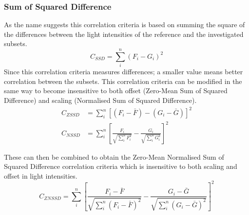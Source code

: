 \documentclass[12pt,oneside,openany,a4paper, %
english, %
masters-t, goldenblock]{usthesis}
\newcommand*\mean[1]{\bar{#1}} %
\begin{document}
\subsubsection{Sum of Squared Difference}
As the name suggests this correlation criteria is based on summing the square of the differences between the light intensities of the reference and the investigated subsets.
\begin{equation}
  C_{SSD} = \sum_i^n \left( F_i - G_i \right)^2 \label{eq: ssd}
\end{equation}
Since this correlation criteria measures differences; a smaller value means better correlation between the subsets. This correlation criteria can be modified in the same way to become insensitive to both offset (Zero-Mean Sum of Squared Difference) and scaling (Normalised Sum of Squared Difference).
\begin{align}
  C_{ZSSD} &= \sum_i^n \left[ \left( F_i - \mean{F} \right) - \left( G_i - \mean{G} \right) \right]^2 \label{eq: zssd} \\
  C_{NSSD} &= \sum_i^n \left[ \frac{F_i}{\sqrt{\sum_i^n F_i^2}} - \frac{G_i}{\sqrt{\sum_i^n G_i^2}} \right]^2 \label{eq: nssd}
\end{align}

These can then be combined to obtain the Zero-Mean Normalised Sum of Squared Difference correlation criteria which is insensitive to both scaling and offset in light intensities.
\begin{equation}
\label{eq: ZNSSD}
  C_{ZNSSD} = \sum_i^n \left[ \frac{F_i - \mean{F}}{\sqrt{\sum_i^n (F_i - \mean{F})^2}} - \frac{G_i - \mean{G}}{\sqrt{\sum_i^n (G_i - \mean{G})^2}} \right]^2
\end{equation}
\end{document}
